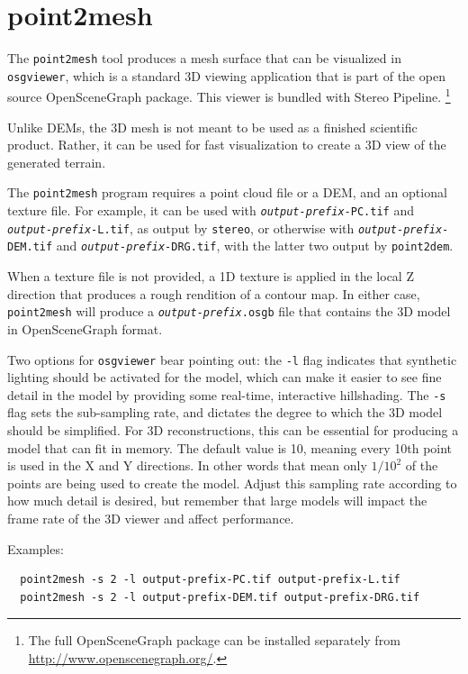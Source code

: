 \section{point2mesh}
\label{point2mesh}

The \texttt{point2mesh} tool produces a mesh surface that can be
visualized in {\tt osgviewer}, which is a standard 3D viewing
application that is part of the open source OpenSceneGraph package.
This viewer is bundled with Stereo Pipeline.
\footnote{The full OpenSceneGraph package can be installed
separately from \url{http://www.openscenegraph.org/}.}

Unlike \acp{DEM}, the 3D mesh is not meant to be used as a finished
scientific product.  Rather, it can be used for fast visualization
to create a 3D view of the generated terrain.

The \texttt{point2mesh} program requires a point cloud file
or a DEM, and an optional texture file.
For example, it can be used with \texttt{\textit{output-prefix}-PC.tif} and
\texttt{\textit{output-prefix}-L.tif}, as output by \texttt{stereo},
or otherwise with \texttt{\textit{output-prefix}-DEM.tif} and
\texttt{\textit{output-prefix}-DRG.tif}, with the latter two output
by \texttt{point2dem}.

When a texture file is not provided, a 1D texture is applied in the local Z direction
that produces a rough rendition of a contour map.  In either case,
\texttt{point2mesh} will produce a \texttt{\textit{output-prefix}.osgb}
file that contains the 3D model in OpenSceneGraph format.

Two options for \texttt{osgviewer} bear pointing out: the \texttt{-l}
flag indicates that synthetic lighting should be activated for the
model, which can make it easier to see fine detail in the model by
providing some real-time, interactive hillshading.  The \verb#-s#
flag sets the sub-sampling rate, and dictates the degree to which
the 3D model should be simplified.  For 3D reconstructions, this
can be essential for producing a model that can fit in memory.  The
default value is 10, meaning every 10th point is used in the X and
Y directions. In other words that mean only $1/10^2$ of the points
are being used to create the model. Adjust this sampling rate
according to how much detail is desired, but remember that large
models will impact the frame rate of the 3D viewer and affect
performance.

Examples:
\begin{verbatim}
  point2mesh -s 2 -l output-prefix-PC.tif output-prefix-L.tif
  point2mesh -s 2 -l output-prefix-DEM.tif output-prefix-DRG.tif
\end{verbatim}


